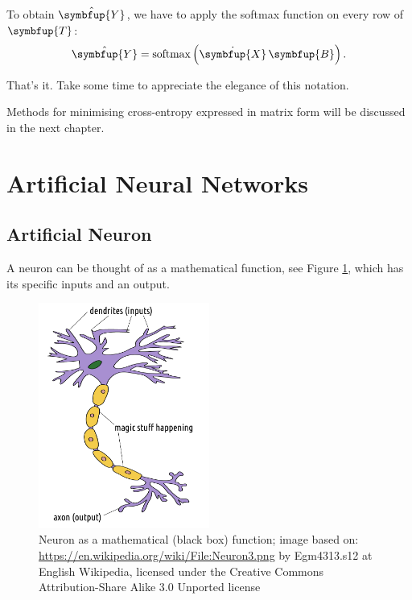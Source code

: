 \documentclass[10pt,b5paper,krantz1]{krantz}
\renewcommand{\mathbf}[1]{\symbfup{#1}}
\begin{document}
To obtain \(\hat{\mathbf{Y}}\), we have to apply the softmax function
on every row of \(\mathbf{T}\):
\[
\hat{\mathbf{Y}}=\mathrm{softmax}\left(
\dot{\mathbf{X}}\,\mathbf{B}
\right).
\]

That's it. Take some time to appreciate the elegance of this notation.

Methods for minimising cross-entropy expressed in matrix form
will be discussed in the next chapter.

\hypertarget{artificial-neural-networks}{%
\section{Artificial Neural Networks}\label{artificial-neural-networks}}

\hypertarget{artificial-neuron}{%
\subsection{Artificial Neuron}\label{artificial-neuron}}

A neuron can be thought of as a mathematical function,
see Figure \ref{fig:neuron}, which has its specific inputs
and an output.

\begin{figure}
\hypertarget{fig:neuron}{%
\centering
\includegraphics[width=0.5\textwidth,height=\textheight]{figures/neuron.pdf}
\caption{Neuron as a mathematical (black box) function; image based on: \url{https://en.wikipedia.org/wiki/File:Neuron3.png} by Egm4313.s12 at English Wikipedia, licensed under the Creative Commons Attribution-Share Alike 3.0 Unported license}\label{fig:neuron}
}
\end{figure}
\end{document}
